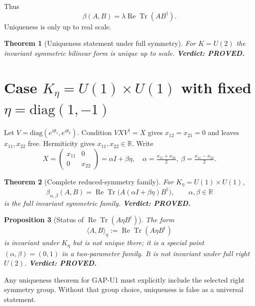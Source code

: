 \documentclass[12pt,a4paper]{article}
\newtheorem{theorem}{Theorem}[section]
\newtheorem{proposition}[theorem]{Proposition}
\theoremstyle{remark}
\begin{document}
Thus
\[
\beta(A,B)=\lambda\operatorname{Re}\operatorname{Tr}(AB^\dagger).
\]
Uniqueness is only up to real scale.

\begin{theorem}[Uniqueness statement under full symmetry]
For $K=U(2)$ the invariant symmetric bilinear form is unique up to scale.
\textbf{Verdict: PROVED.}
\end{theorem}

\section{Case $K_\eta=U(1)\times U(1)$ with fixed $\eta=\mathrm{diag}(1,-1)$}

Let $V=\mathrm{diag}(e^{i\theta_1},e^{i\theta_2})$.
Condition $VXV^\dagger=X$ gives $x_{12}=x_{21}=0$ and leaves $x_{11},x_{22}$ free.
Hermiticity gives $x_{11},x_{22}\in\mathbb R$.
Write
\[
X=\begin{pmatrix}x_{11}&0\\0&x_{22}\end{pmatrix}
=\alpha I+\beta\eta,
\quad
\alpha=\tfrac{x_{11}+x_{22}}2,
\ \beta=\tfrac{x_{11}-x_{22}}2.
\]

\begin{theorem}[Complete reduced-symmetry family]
For $K_\eta=U(1)\times U(1)$,
\[
\beta_{\alpha,\beta}(A,B)=\operatorname{Re}\operatorname{Tr}\!\big(A(\alpha I+\beta\eta)B^\dagger\big),\qquad \alpha,\beta\in\mathbb R
\]
is the full invariant symmetric family.
\textbf{Verdict: PROVED.}
\end{theorem}

\begin{proposition}[Status of $\operatorname{Re}\operatorname{Tr}(A\eta B^\dagger)$]
The form
\[
\langle A,B\rangle_\eta:=\operatorname{Re}\operatorname{Tr}(A\eta B^\dagger)
\]
is invariant under $K_\eta$ but is not unique there; it is a special point $(\alpha,\beta)=(0,1)$ in a two-parameter family.
It is not invariant under full right $U(2)$.
\textbf{Verdict: PROVED.}
\end{proposition}

\begin{resultbox}
Any uniqueness theorem for GAP-U1 must explicitly include the selected right symmetry group. Without that group choice, uniqueness is false as a universal statement.
\end{resultbox}

\ifdefined\INCLUDEMODE
\else
\end{document}
